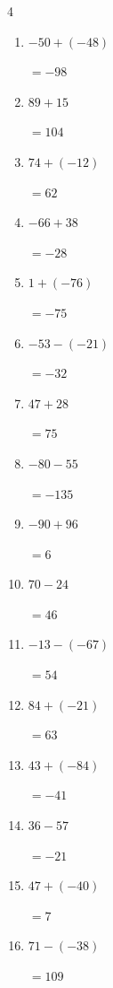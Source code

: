 \begin{multicols}{4}
\begin{enumerate}
        $=-104$

  \item $-50+(-48)$

        $=-98$

  \item $89+15$

        $=104$

  \item $74+(-12)$

        $=62$

  \item $-66+38$

        $=-28$

  \item $1+(-76)$

        $=-75$

  \item $-53-(-21)$

        $=-32$

  \item $47+28$

        $=75$

  \item $-80-55$

        $=-135$

  \item $-90+96$

        $=6$

\columnbreak %

\resetques

  \item $70-24$

        $=46$

  \item $-13-(-67)$

        $=54$

  \item $84+(-21)$

        $=63$

  \item $43+(-84)$

        $=-41$

  \item $36-57$

        $=-21$

  \item $47+(-40)$

        $=7$

  \item $71-(-38)$

        $=109$


\end{enumerate}
\end{multicols}
